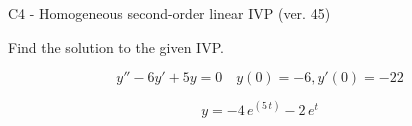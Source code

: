 \begin{exercise}
  \begin{exerciseTitle}C4 - Homogeneous second-order linear IVP (ver. 45)\end{exerciseTitle}
  \begin{exerciseStatement}
    
Find the solution to the given IVP.

    
\[y''-6y'+5y = 0 \hspace{1em} y(0) = -6 , y'(0) = -22\]

  \end{exerciseStatement}
  \begin{exerciseAnswer}
    
\[y= -4 \, e^{\left(5 \, t\right)} - 2 \, e^{t}\]

  \end{exerciseAnswer}
\end{exercise}
